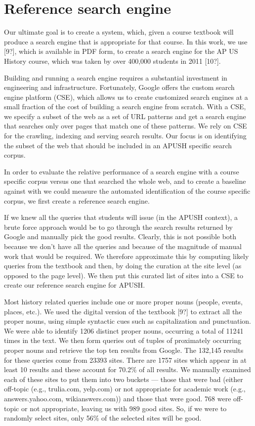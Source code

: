 \documentclass{acm_proc_article-sp}
\begin{document}
\section{Reference search engine}

Our ultimate goal is to create a system, which, given a course textbook will
produce a search engine that is appropriate for that course. In this work, we
use [9?], which is available in PDF form, to create a search engine for the AP US
History course, which was taken by over 400,000 students in 2011 [10?]. 

Building and running a search engine requires a substantial investment in
engineering and infrastructure. Fortunately, Google offers the custom search
engine platform (CSE), which allows us to create customized search engines at a
small fraction of the cost of building a search engine from scratch. With a CSE,
we specify a subset of the web as a set of URL patterns and get a search engine
that searches only over pages that match one of these patterns. We rely on CSE
for the crawling, indexing and serving search results. Our focus is on
identifying the subset of the web that should be included in an APUSH specific
search corpus. 

In order to evaluate the relative performance of a search engine with a course
specific corpus versus one that searched the whole web, and to create a baseline
against with we could measure the automated identification of the course
specific corpus, we first create a reference search engine. 

If we knew all the queries that students will issue (in the APUSH context), a
brute force approach would be to go through the search results returned by
Google and manually pick the good results. Clearly, this is not possible both
because we don't have all the queries and because of the magnitude of manual
work that would be required. We therefore approximate this by computing likely
queries from the textbook and then, by doing the curation at the site level (as
opposed to the page level). We then put this curated list of sites into a CSE to
create our reference search engine for APUSH. 

Most history related queries include one or more proper nouns (people, events,
places, etc.). We used the digital version of the textbook [9?] to extract all
the proper nouns, using simple syntactic cues such as capitalization and
punctuation. We were able to identify 1206 distinct proper nouns, occurring a
total of 11241 times in the text. We then form queries out of tuples of
proximately occurring proper nouns and retrieve the top ten results from
Google. The 132,145 results for these queries come from 23393 sites. There are
1757 sites which appear in at least 10 results and these account for 70.2\% of
all results. We manually examined each of these sites to put them into two
buckets --- those that were bad (either off-topic (e.g., trulia.com, yelp.com)
or not appropriate for academic work (e.g., answers.yahoo.com, wikianswers.com))
and those that were good. 768 were off-topic or not appropriate, leaving us with
989 good sites. So, if we were to randomly select sites, only 56\% of the
selected sites will be good. 
\end{document}
